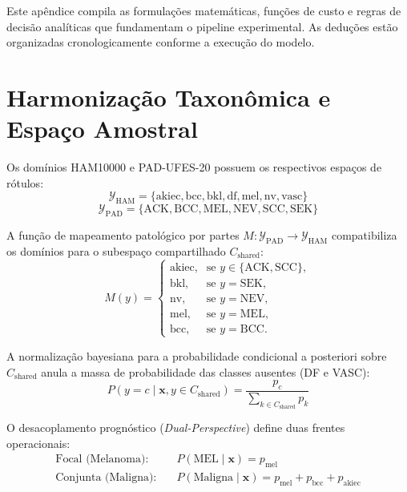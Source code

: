 \documentclass[oneside,english,brazilian]{UNISINOSmonografia}
\begin{document}
Este apêndice compila as formulações matemáticas, funções de custo e regras de decisão analíticas que fundamentam o pipeline experimental. As deduções estão organizadas cronologicamente conforme a execução do modelo.

\section{Harmonização Taxonômica e Espaço Amostral}
\label{sec:apendice_harmonizacao}

Os domínios HAM10000 e PAD-UFES-20 possuem os respectivos espaços de rótulos:
$$ \mathcal{Y}_{\text{HAM}} = \{\text{akiec}, \text{bcc}, \text{bkl}, \text{df}, \text{mel}, \text{nv}, \text{vasc}\} $$
$$ \mathcal{Y}_{\text{PAD}} = \{\text{ACK}, \text{BCC}, \text{MEL}, \text{NEV}, \text{SCC}, \text{SEK}\} $$

A função de mapeamento patológico por partes $M: \mathcal{Y}_{\text{PAD}} \to \mathcal{Y}_{\text{HAM}}$ compatibiliza os domínios para o subespaço compartilhado $C_{\text{shared}}$:
\begin{equation}
    \label{eq:apendice_mapeamento_taxonomico}
    M(y) = 
    \begin{cases}
        \text{akiec}, & \text{se } y \in \{\text{ACK}, \text{SCC}\}, \\
        \text{bkl},   & \text{se } y = \text{SEK}, \\
        \text{nv},    & \text{se } y = \text{NEV}, \\
        \text{mel},   & \text{se } y = \text{MEL}, \\
        \text{bcc},   & \text{se } y = \text{BCC}.
    \end{cases}
\end{equation}

A normalização bayesiana para a probabilidade condicional a posteriori sobre $C_{\text{shared}}$ anula a massa de probabilidade das classes ausentes (DF e VASC):
\begin{equation}
    \label{eq:apendice_prob_condicional}
    P(y = c \mid \mathbf{x}, y \in C_{\text{shared}}) = \frac{p_c}{\sum_{k \in C_{\text{shared}}} p_k}
\end{equation}

O desacoplamento prognóstico (\textit{Dual-Perspective}) define duas frentes operacionais:
\begin{align}
    \text{Focal (Melanoma):} \quad & P(\text{MEL} \mid \mathbf{x}) = p_{\text{mel}} \label{eq:apendice_projecao_melanoma} \\
    \text{Conjunta (Maligna):} \quad & P(\text{Maligna} \mid \mathbf{x}) = p_{\text{mel}} + p_{\text{bcc}} + p_{\text{akiec}} \label{eq:apendice_projecao_maligna}
\end{align}
\end{document}

